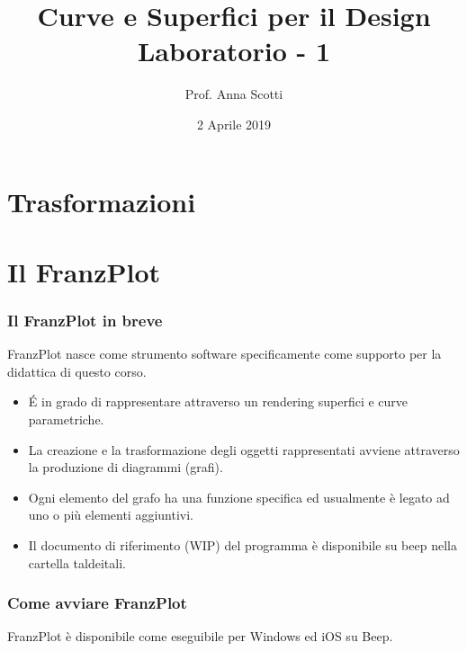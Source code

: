 \documentclass{beamer}
\title[Curve e Sup. - Lab 1]{Curve e Superfici per il Design \\ Laboratorio - 1}
\author[Prof. Scotti]{Prof. Anna Scotti}
\date{2 Aprile 2019}
\newcommand{\frnzplt}{FranzPlot }
\begin{document}
\begin{frame}
\maketitle
\end{frame}
\section{Trasformazioni}

\section{Il \frnzplt}
\begin{frame}
\frametitle{Il \frnzplt in breve}
\frnzplt nasce come strumento software specificamente come supporto per la didattica di questo corso.
\begin{itemize}
  \item \'E in grado di rappresentare attraverso un rendering superfici e curve parametriche.
  \item La creazione e la trasformazione degli oggetti rappresentati avviene attraverso la produzione di diagrammi (grafi).
  \item Ogni elemento del grafo ha una funzione specifica ed usualmente \`e legato ad uno o pi\`u elementi aggiuntivi.
  \item Il documento di riferimento (WIP) del programma \`e disponibile su beep nella cartella taldeitali.
\end{itemize}
\end{frame}
\begin{frame}
\frametitle{Come avviare \frnzplt}
\frnzplt \`e disponibile come eseguibile per Windows ed iOS su Beep. 
\end{frame}
\end{document}
